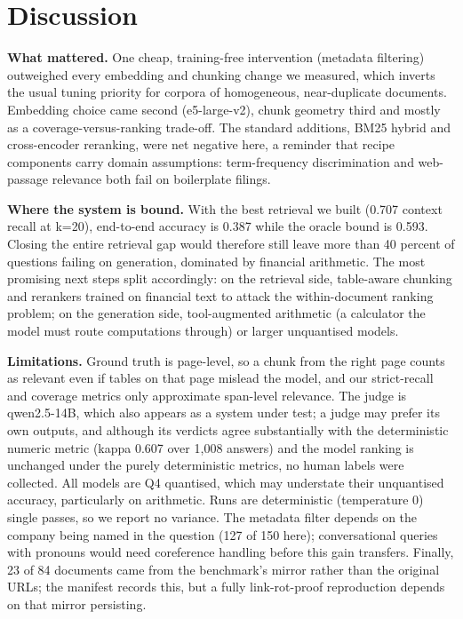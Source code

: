 \documentclass[
  11pt,
]{article}
\begin{document}
\section{Discussion}\label{discussion}

\textbf{What mattered.} One cheap, training-free intervention (metadata
filtering) outweighed every embedding and chunking change we measured,
which inverts the usual tuning priority for corpora of homogeneous,
near-duplicate documents. Embedding choice came second (e5-large-v2),
chunk geometry third and mostly as a coverage-versus-ranking trade-off.
The standard additions, BM25 hybrid and cross-encoder reranking, were
net negative here, a reminder that recipe components carry domain
assumptions: term-frequency discrimination and web-passage relevance
both fail on boilerplate filings.

\textbf{Where the system is bound.} With the best retrieval we built
(0.707 context recall at k=20), end-to-end accuracy is 0.387 while the
oracle bound is 0.593. Closing the entire retrieval gap would therefore
still leave more than 40 percent of questions failing on generation,
dominated by financial arithmetic. The most promising next steps split
accordingly: on the retrieval side, table-aware chunking and rerankers
trained on financial text to attack the within-document ranking problem;
on the generation side, tool-augmented arithmetic (a calculator the
model must route computations through) or larger unquantised models.

\textbf{Limitations.} Ground truth is page-level, so a chunk from the
right page counts as relevant even if tables on that page mislead the
model, and our strict-recall and coverage metrics only approximate
span-level relevance. The judge is qwen2.5-14B, which also appears as a
system under test; a judge may prefer its own outputs, and although its
verdicts agree substantially with the deterministic numeric metric
(kappa 0.607 over 1,008 answers) and the model ranking is unchanged
under the purely deterministic metrics, no human labels were collected.
All models are Q4 quantised, which may understate their unquantised
accuracy, particularly on arithmetic. Runs are deterministic
(temperature 0) single passes, so we report no variance. The metadata
filter depends on the company being named in the question (127 of 150
here); conversational queries with pronouns would need coreference
handling before this gain transfers. Finally, 23 of 84 documents came
from the benchmark's mirror rather than the original URLs; the manifest
records this, but a fully link-rot-proof reproduction depends on that
mirror persisting.
\end{document}
